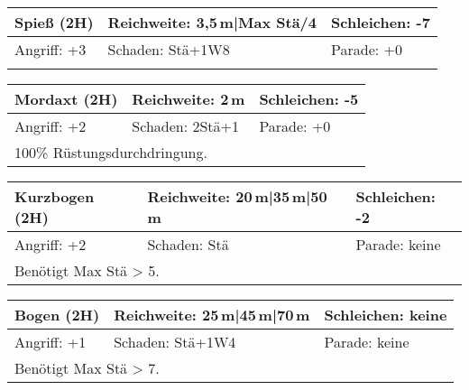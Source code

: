 \documentclass[../../Heldenanleitung2]{subfiles}
\begin{document}
\newline \newline\newline
\begin{tabular}{|p{}|p{}|p{}|}
\hline
\textbf{Spieß (2H)} & Reichweite: 3,5\,m|Max Stä/4 & Schleichen: -7\\
\hline
Angriff: +3 & Schaden: Stä+1W8 & Parade: +0\\
\hline
\multicolumn{3}{|p{0.99\textwidth}|}{} \\
\hline
\end{tabular}
\newline \newline\newline
\begin{tabular}{|p{}|p{}|p{}|}
\hline
\textbf{Mordaxt (2H)} & Reichweite: 2\,m & Schleichen: -5\\
\hline
Angriff: +2 & Schaden: 2Stä+1 & Parade: +0\\
\hline
\multicolumn{3}{|p{0.99\textwidth}|}{100\% Rüstungsdurchdringung.} \\
\hline
\end{tabular}
\newline \newline\newline
\begin{tabular}{|p{}|p{}|p{}|}
\hline
\textbf{Kurzbogen (2H)} & Reichweite: 20\,m|35\,m|50\,m & Schleichen: -2 \\
\hline
Angriff: +2 & Schaden: Stä & Parade: keine\\
\hline
\multicolumn{3}{|p{0.99\textwidth}|}{Benötigt Max Stä > 5.} \\
\hline
\end{tabular}
\newline \newline\newline
\begin{tabular}{|p{}|p{}|p{}|}
\hline
\textbf{Bogen (2H)} & Reichweite: 25\,m|45\,m|70\,m & Schleichen: keine\\
\hline
Angriff: +1 & Schaden: Stä+1W4 & Parade: keine\\
\hline
\multicolumn{3}{|p{0.99\textwidth}|}{Benötigt Max Stä > 7.} \\
\hline
\end{tabular}
\newline \newline\newline
\end{document}
